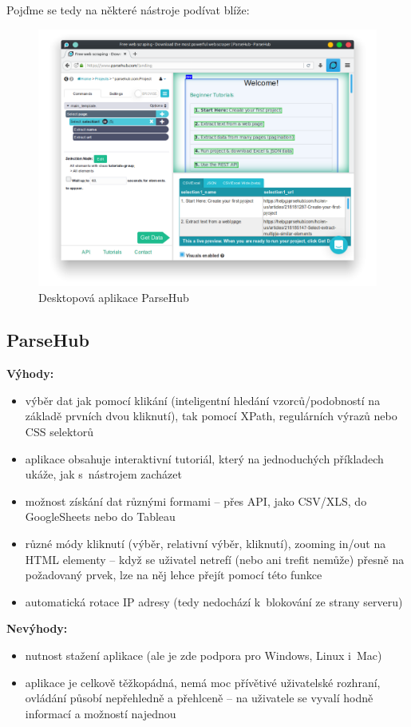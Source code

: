 \documentclass[thesis=B,czech]{FITthesis}[2012/06/26]
\begin{document}
Poj\v{d}me se tedy na některé nástroje podívat blíže:

\begin{figure}
	\includegraphics[width=\linewidth]{images/ParseHub.png}
	\caption[Desktopová aplikace ParseHub]{Desktopová aplikace ParseHub~\cite[snímek pořídil autor]{parsehub}}
	\label{fig:parseHub}
\end{figure}
\subsection{ParseHub}
\textbf{Výhody:}
\begin{itemize}
	\item výběr dat jak pomocí klikání (inteligentní hledání vzorců/podobností na základě prvních dvou kliknutí), tak pomocí XPath, regulárních výrazů nebo CSS selektorů
	\item aplikace obsahuje interaktivní tutoriál, který na jednoduchých příkladech ukáže, jak s~nástrojem zacházet
	\item možnost získání dat různými formami -- přes API, jako CSV/XLS, do GoogleSheets nebo do Tableau
	\item různé módy kliknutí (výběr, relativní výběr, kliknutí), zooming in/out na HTML elementy -- když se uživatel netrefí (nebo ani trefit nemůže) přesně na požadovaný prvek, lze na něj lehce přejít pomocí této funkce
	\item automatická rotace IP adresy (tedy nedochází k~blokování ze strany serveru)
\end{itemize}
\textbf{Nevýhody:}
\begin{itemize}
	\item nutnost stažení aplikace (ale je zde podpora pro Windows, Linux i~Mac)
	\item aplikace je celkově těžkopádná, nemá moc přívětivé uživatelské rozhraní, ovládání působí nepřehledně a přehlceně -- na uživatele se vyvalí hodně informací a možností najednou
\end{itemize}
\end{document}

